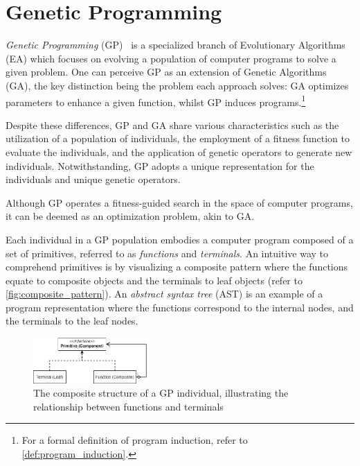 \section{Genetic Programming}
\label{sec:genetic_programming}
  \emph{Genetic Programming} (GP)~\autocite{kozaGeneticProgrammingProgramming1992a,kozaGeneticProgrammingII1994,poliFieldGuideGenetic2008a,yuIntroductionEvolutionaryAlgorithms2010}
  is a specialized branch of Evolutionary Algorithms (EA) which focuses on 
  evolving a population of computer programs to solve a given problem.
  One can perceive GP as an extension of Genetic Algorithms (GA), the key
  distinction being the problem each approach solves: GA optimizes parameters to 
  enhance a given function, whilst GP induces programs.\footnote{%
      For a formal definition of program induction, refer to 
      \vref{def:program_induction}.
  }

  Despite these differences, GP and GA share various characteristics such as the 
  utilization of a population of individuals, the employment of a fitness
  function to evaluate the individuals, and the application of genetic operators
  to generate new individuals.
  Notwithstanding, GP adopts a unique representation for the individuals and 
  unique genetic operators.

  \begin{remark}
    Although GP operates a fitness-guided search in the space of computer 
    programs, it can be deemed as an optimization problem, akin to GA.
  \end{remark}

  Each individual in a GP population embodies a computer program composed of a set
  of primitives, referred to as \emph{functions} and \emph{terminals}.
  An intuitive way to comprehend primitives is by visualizing a composite pattern
  where the functions equate to composite objects and the terminals to leaf
  objects (refer to \vref{fig:composite_pattern}).
  An \emph{abstract syntax tree} (AST) is an example of a program representation
  where the functions correspond to the internal nodes, and the terminals to the
  leaf nodes.

  \begin{figure}[ht!]
    \centering
    \includegraphics[width=0.4\textwidth]{img/theoretical_framework/GP Composite.png}
    \caption{
      The composite structure of a GP individual, illustrating the relationship
      between functions and terminals
    }
    \label{fig:composite_pattern}
  \end{figure}

